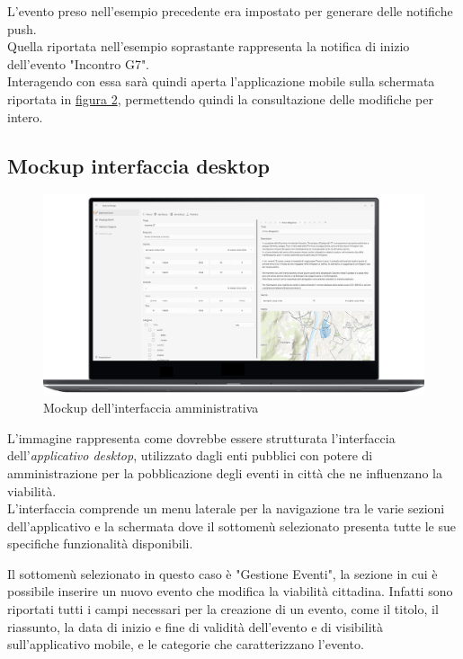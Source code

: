 \documentclass{article}
\begin{document}
L'evento preso nell'esempio precedente era impostato per generare delle notifiche push.\\
Quella riportata nell'esempio soprastante rappresenta la notifica di inizio dell'evento "Incontro G7".\\
Interagendo con essa sarà quindi aperta l'applicazione mobile sulla schermata riportata in \hyperref[fig:Dettaglio_evento]{figura 2}, permettendo quindi la consultazione delle modifiche per intero.\\

\clearpage

\subsection{Mockup interfaccia desktop}
\begin{figure}[htbp]
    \label{4.2}
    \centering
    \includegraphics[width=1\textwidth]{Images/Mockup1 - Desktop.png}
    \caption{Mockup dell'interfaccia amministrativa}
\end{figure}

L'immagine rappresenta come dovrebbe essere strutturata l'interfaccia dell'\textit{applicativo desktop}, utilizzato dagli enti pubblici con potere di amministrazione per la pobblicazione degli eventi in città che ne influenzano la viabilità.\\
L'interfaccia comprende un menu laterale per la navigazione tra le varie sezioni dell'applicativo e la schermata dove il sottomenù selezionato presenta tutte le sue specifiche funzionalità disponibili.

Il sottomenù selezionato in questo caso è "Gestione Eventi", la sezione in cui è possibile inserire un nuovo evento che modifica la viabilità cittadina. Infatti sono riportati tutti i campi necessari per la creazione di un evento, come il titolo, il riassunto, la data di inizio e fine di validità dell'evento e di visibilità sull'applicativo mobile, e le categorie che caratterizzano l'evento.
\end{document}
